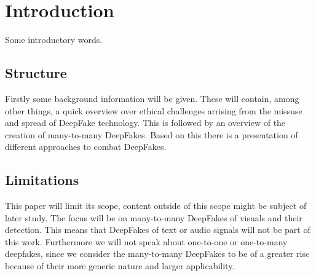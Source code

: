 \section{Introduction}
Some introductory words.

\subsection{Structure}
Firstly some background information will be given. These will contain, among 
other things, a quick overview over ethical challenges arrising from the missuse
and spread of DeepFake technology.
This is followed by an overview of the creation of many-to-many DeepFakes.
Based on this there is a presentation of different approaches to combat DeepFakes.

\subsection{Limitations}
This paper will limit its scope, content outside of this scope might be subject
of later study.
The focus will be on many-to-many DeepFakes of visuals and their detection.
This means that DeepFakes of text or audio signals will not be part of this work.
Furthermore we will not speak about one-to-one or one-to-many deepfakes, since
we consider the
many-to-many DeepFakes to be of a greater risc because of their more generic
nature and larger applicability.
